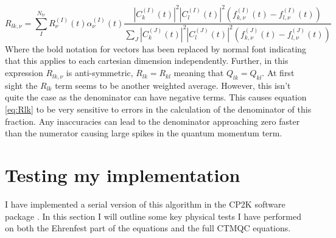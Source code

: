 \begin{equation}
  R_{lk, \nu} = \sum_{I}^{N_{tr}} R_{\nu}^{(I)}(t) \alpha_{\nu}^{(I)}(t) \frac{|C_{k}^{(I)}(t)|^2 |C_{l}^{(I)}(t)|^2 \left( f_{k, \nu}^{(I)}(t) - f_{l, \nu}^{(I)}(t) \right)}{\sum_{J} |C_{k}^{(J)}(t)|^2 |C_{l}^{(J)}(t)|^2 \left( f_{k, \nu}^{(J)}(t) - f_{l, \nu}^{(J)}(t) \right)}
  \label{eq:Rlk}
\end{equation}
Where the bold notation for vectors has been replaced by normal font indicating that this applies to each cartesian dimension independently. Further, in this expression $R_{lk, \nu}$ is anti-symmetric, $R_{lk} = R_{kl}$ meaning that $Q_{lk} = Q_{kl}$. At first sight the $R_{lk}$ term seems to be another weighted average. However, this isn't quite the case as the denominator can have negative terms. This causes equation \eqref{eq:Rlk} to be very sensitive to errors in the calculation of the denominator of this fraction. Any inaccuracies can lead to the denominator approaching zero faster than the numerator causing large spikes in the quantum momentum term.

\section{Testing my implementation}
I have implemented a serial version of this algorithm in the CP2K software package \cite{CP2K}. In this section I will outline some key physical tests I have performed on both the Ehrenfest part of the equations and the full CTMQC equations.
